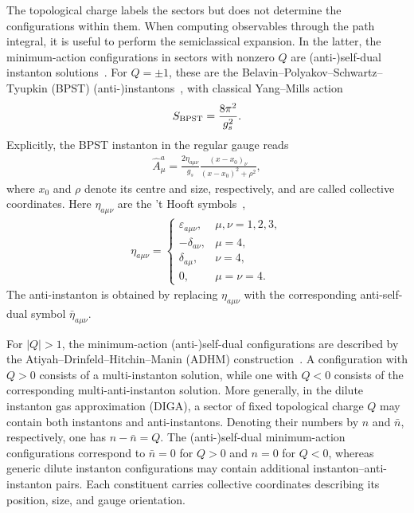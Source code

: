 \documentclass[review]{elsarticle}
\numberwithin{equation}{section}
\numberwithin{table}{section}
\numberwithin{figure}{section}
\begin{document}
The topological charge labels the sectors but does not determine the configurations within them. When computing observables through the path integral, it is useful to perform the semiclassical expansion. In the latter, the minimum-action configurations in sectors with nonzero $Q$ are (anti-)self-dual instanton solutions~\cite{tHooft:1976rip,tHooft:1976snw,Coleman:1985rnk,Diakonov:2002fq}. For $Q=\pm1$, these are the Belavin--Polyakov--Schwartz--Tyupkin (BPST) (anti-)instantons~\cite{Belavin:1975fg}, with classical Yang--Mills action
\begin{align}
    S_{\rm BPST} = \frac{8\pi^2}{g_s^2}.
\end{align}
Explicitly, the BPST instanton in the regular gauge reads
\begin{align}
    \hat A^a_\mu = \frac{2\eta_{a\mu\nu}}{g_s}\frac{(x-x_0)_\nu}{(x-x_0)^2+\rho^2},
    \label{eq:BPSTinst}
\end{align}
where $x_0$ and $\rho$ denote its centre and size, respectively, and are called collective coordinates. Here $\eta_{a\mu\nu}$ are the 't Hooft symbols~\cite{tHooft:1976snw},
\begin{align}
    \eta_{a\mu\nu} = 
    \begin{cases} 
    \varepsilon_{a\mu\nu}, & \mu,\nu=1,2,3,\\
    -\delta_{a\nu}, & \mu=4,\\
    \delta_{a\mu}, & \nu=4,\\
    0, & \mu=\nu=4.
    \end{cases}
\end{align}
The anti-instanton is obtained by replacing $\eta_{a\mu\nu}$ with the corresponding anti-self-dual symbol $\bar{\eta}_{a\mu\nu}$.

For $|Q|>1$, the minimum-action (anti-)self-dual configurations are described by the Atiyah--Drinfeld--Hitchin--Manin (ADHM) construction~\cite{Atiyah:1978ri}. A configuration with $Q>0$ consists of a multi-instanton solution, while one with $Q<0$ consists of the corresponding multi-anti-instanton solution. More generally, in the dilute instanton gas approximation (DIGA), a sector of fixed topological charge $Q$ may contain both instantons and anti-instantons. Denoting their numbers by $n$ and $\bar n$, respectively, one has $n-\bar n=Q$. The (anti-)self-dual minimum-action configurations correspond to $\bar n=0$ for $Q>0$ and $n=0$ for $Q<0$, whereas generic dilute instanton configurations may contain additional instanton--anti-instanton pairs. Each constituent carries collective coordinates describing its position, size, and gauge orientation.
\end{document}
